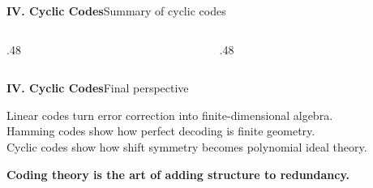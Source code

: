 \begin{frame}{\textbf{IV. Cyclic Codes}}{Summary of cyclic codes}
\small
\begin{columns}[T,onlytextwidth]
  \begin{column}{.48\textwidth}
  \end{column}
  \begin{column}{.48\textwidth}
  \end{column}
\end{columns}
\end{frame}

\begin{frame}{\textbf{IV. Cyclic Codes}}{Final perspective}
\small
\begin{alertblock}{}
\centering
Linear codes turn error correction into finite-dimensional algebra.\\[4pt]
Hamming codes show how perfect decoding is finite geometry.\\[4pt]
Cyclic codes show how shift symmetry becomes polynomial ideal theory.
\end{alertblock}
\bigskip
\begin{center}
\large
\textbf{Coding theory is the art of adding structure to redundancy.}
\end{center}
\end{frame}
